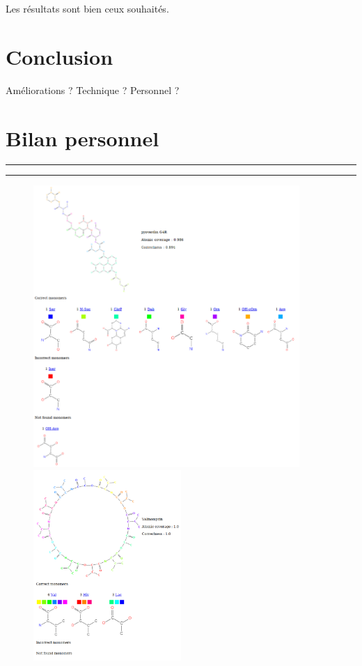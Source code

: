 \documentclass[11pt, a4paper]{report}
\begin{document}
	Les résultats sont bien ceux souhaités.
	
	
	\chapter*{Conclusion}
	Améliorations ? Technique ? Personnel ?
	
	\chapter*{Bilan personnel}
	
	
	
	
	
	
	
	
	
	\pagebreak
	
	\vspace{900px}
	
	\rule{1\textwidth}{.8pt}
	\rule{1\textwidth}{.8pt}
	
	\begin{figure}[H]
		\centering
		\includegraphics[width=0.9\textwidth]{images/pyoverdin G4R.png}
		\hspace{2cm}
		\includegraphics[width=0.5\textwidth]{images/Valinomycin.png}
	\end{figure}
	
\end{document}
